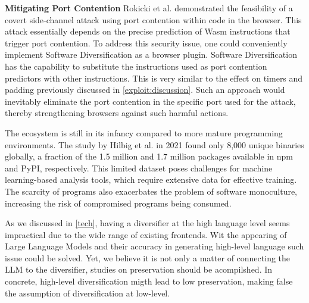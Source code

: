 \textbf{Mitigating Port Contention}
Rokicki et al. \cite{10.1145/3488932.3517411} demonstrated the feasibility of a covert side-channel attack using port contention within \Wasm code in the browser. 
This attack essentially depends on the precise prediction of Wasm instructions that trigger port contention.
To address this security issue, one could conveniently implement Software Diversification as a browser plugin. 
Software Diversification has the capability to substitute the \wasm instructions used as port contention predictors with other instructions. 
This is very similar to the effect on timers and padding previously discussed in \autoref{exploit:discussion}.
Such an approach would inevitably eliminate the port contention in the specific port used for the attack, thereby strengthening browsers against such harmful actions.



 The \Wasm ecosystem is still in its infancy compared to more mature programming environments. 
The study by Hilbig et al. in 2021 found only 8,000 unique \Wasm binaries globally\cite{Hilbig2021AnES}, a fraction of the 1.5 million and 1.7 million packages available in npm and PyPI, respectively. 
This limited dataset poses challenges for machine learning-based analysis tools, which require extensive data for effective training. 
The scarcity of \Wasm programs also exacerbates the problem of software monoculture, increasing the risk of compromised \Wasm programs being consumed\cite{usenixWasm2020}. 

As we discussed in \autoref{tech}, having a diversifier at the high language level seems impractical due to the wide range of existing frontends.
Wit the appearing of Large Language Models and their accuracy in generating high-level language such issue could be solved.
Yet, we believe it is not only a matter of connecting the LLM to the diversifier, studies on preservation should be acompilshed.
In concrete, high-level diversification migth lead to low preservation, making false the assumption of diversification at low-level.
